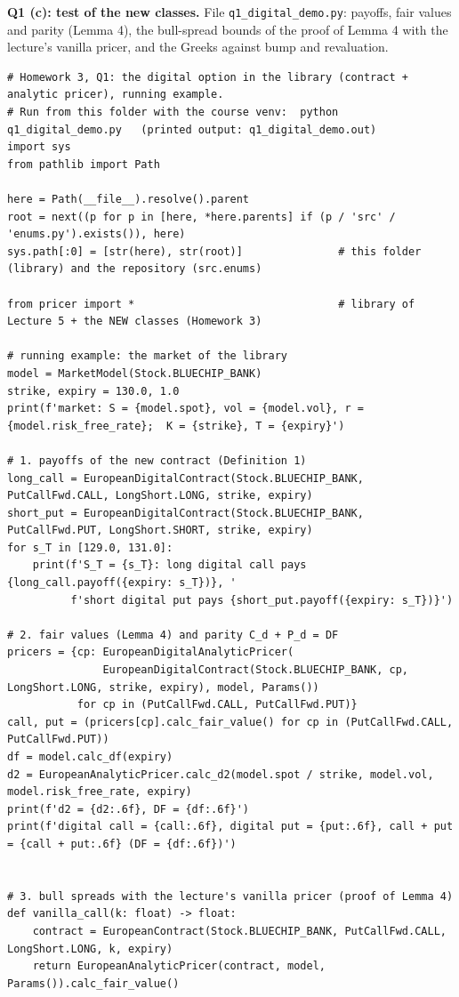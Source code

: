\documentclass[11pt,a4paper]{article}
\newcommand{\step}[1]{\par\smallskip\noindent\textbf{#1}\enspace\ignorespaces}
\begin{document}
\step{Q1 (c): test of the new classes.} File \texttt{q1\_digital\_demo.py}: payoffs, fair values and parity (Lemma 4), the bull-spread bounds of the proof of Lemma 4 with the lecture's vanilla pricer, and the Greeks against bump and revaluation.
\begin{lstlisting}[style=pysmall]
# Homework 3, Q1: the digital option in the library (contract + analytic pricer), running example.
# Run from this folder with the course venv:  python q1_digital_demo.py   (printed output: q1_digital_demo.out)
import sys
from pathlib import Path

here = Path(__file__).resolve().parent
root = next((p for p in [here, *here.parents] if (p / 'src' / 'enums.py').exists()), here)
sys.path[:0] = [str(here), str(root)]               # this folder (library) and the repository (src.enums)

from pricer import *                                # library of Lecture 5 + the NEW classes (Homework 3)

# running example: the market of the library
model = MarketModel(Stock.BLUECHIP_BANK)
strike, expiry = 130.0, 1.0
print(f'market: S = {model.spot}, vol = {model.vol}, r = {model.risk_free_rate};  K = {strike}, T = {expiry}')

# 1. payoffs of the new contract (Definition 1)
long_call = EuropeanDigitalContract(Stock.BLUECHIP_BANK, PutCallFwd.CALL, LongShort.LONG, strike, expiry)
short_put = EuropeanDigitalContract(Stock.BLUECHIP_BANK, PutCallFwd.PUT, LongShort.SHORT, strike, expiry)
for s_T in [129.0, 131.0]:
    print(f'S_T = {s_T}: long digital call pays {long_call.payoff({expiry: s_T})}, '
          f'short digital put pays {short_put.payoff({expiry: s_T})}')

# 2. fair values (Lemma 4) and parity C_d + P_d = DF
pricers = {cp: EuropeanDigitalAnalyticPricer(
               EuropeanDigitalContract(Stock.BLUECHIP_BANK, cp, LongShort.LONG, strike, expiry), model, Params())
           for cp in (PutCallFwd.CALL, PutCallFwd.PUT)}
call, put = (pricers[cp].calc_fair_value() for cp in (PutCallFwd.CALL, PutCallFwd.PUT))
df = model.calc_df(expiry)
d2 = EuropeanAnalyticPricer.calc_d2(model.spot / strike, model.vol, model.risk_free_rate, expiry)
print(f'd2 = {d2:.6f}, DF = {df:.6f}')
print(f'digital call = {call:.6f}, digital put = {put:.6f}, call + put = {call + put:.6f} (DF = {df:.6f})')


# 3. bull spreads with the lecture's vanilla pricer (proof of Lemma 4)
def vanilla_call(k: float) -> float:
    contract = EuropeanContract(Stock.BLUECHIP_BANK, PutCallFwd.CALL, LongShort.LONG, k, expiry)
    return EuropeanAnalyticPricer(contract, model, Params()).calc_fair_value()



\end{lstlisting}
\end{document}
